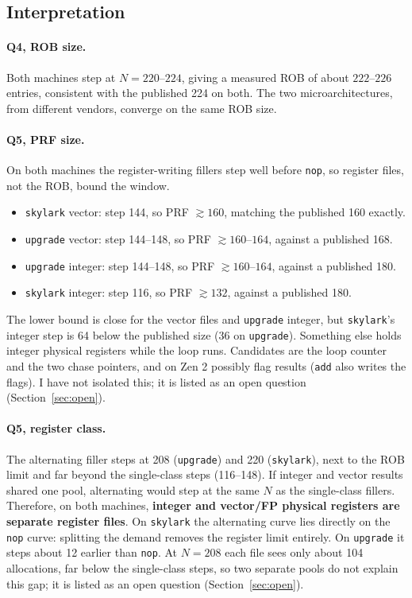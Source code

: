 \documentclass[11pt]{article}
\newcommand{\up}{\texttt{upgrade}}
\newcommand{\sk}{\texttt{skylark}}
\begin{document}
\subsection{Interpretation}

\paragraph{Q4, ROB size.} Both machines step at $N = 220$--$224$, giving a
measured ROB of about $222$--$226$ entries, consistent with the published 224
on both. The two microarchitectures, from different vendors, converge on the
same ROB size.

\paragraph{Q5, PRF size.} On both machines the register-writing fillers step
well before \texttt{nop}, so register files, not the ROB, bound the window.
\begin{itemize}
\item \sk{} vector: step 144, so PRF $\gtrsim 160$, matching the published 160 exactly.
\item \up{} vector: step 144--148, so PRF $\gtrsim 160$--$164$, against a published 168.
\item \up{} integer: step 144--148, so PRF $\gtrsim 160$--$164$, against a published 180.
\item \sk{} integer: step 116, so PRF $\gtrsim 132$, against a published 180.
\end{itemize}
The lower bound is close for the vector files and \up{} integer, but \sk{}'s
integer step is 64 below the published size (36 on \up). Something else holds
integer physical registers while the loop runs. Candidates are the loop
counter and the two chase pointers, and on Zen 2 possibly flag results
(\texttt{add} also writes the flags). I have not isolated this; it is listed
as an open question (Section~\ref{sec:open}).

\paragraph{Q5, register class.} The alternating filler steps at 208
(\up) and 220 (\sk), next to the ROB limit and far beyond the
single-class steps (116--148). If integer and vector results shared one
pool, alternating would step at the same $N$ as the single-class fillers.
Therefore, on both machines, \textbf{integer and vector/FP physical
registers are separate register files}. On \sk{} the alternating curve lies
directly on the \texttt{nop} curve: splitting the demand removes the
register limit entirely. On \up{} it steps about 12 earlier than
\texttt{nop}. At $N = 208$ each file sees only about 104 allocations, far
below the single-class steps, so two separate pools do not explain this gap;
it is listed as an open question (Section~\ref{sec:open}).
\end{document}
